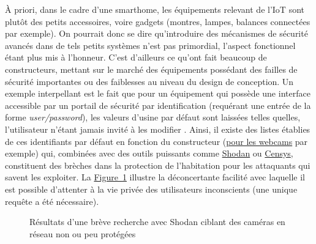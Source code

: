 \documentclass[]{article}
\newcommand{\wordlink}[2]{\hyperref[#1]{#2~\ref{#1}}}
\begin{document}
À priori, dans le cadre d'une smarthome, les équipements relevant de l'IoT sont plutôt des petits accessoires, voire gadgets (montres, lampes, balances connectées par exemple). On pourrait donc se dire qu'introduire des mécanismes de sécurité avancés dans de tels petits systèmes n'est pas primordial, l'aspect fonctionnel étant plus mis à l'honneur. C'est d'ailleurs ce qu'ont fait beaucoup de constructeurs, mettant sur le marché des équipements possédant des failles de sécurité importantes ou des faiblesses au niveau du design de conception. Un exemple interpellant est le fait que pour un équipement qui possède une interface accessible par un portail de sécurité par identification (requérant une entrée  de la forme \textit{user/password}), les valeurs d'usine par défaut sont laissées telles quelles, l'utilisateur n'étant jamais invité à les modifier \cite{Leos2014}. Ainsi, il existe des listes établies de ces identifiants par défaut en fonction du constructeur (\href{https://www.ispyconnect.com/userguide-default-passwords.aspx}{pour les webcams} par exemple) qui, combinées avec des outils puissants comme \href{https://www.shodan.io/}{Shodan} ou \href{https://censys.io/}{Censys}, constituent des brèches dans la protection de l'habitation pour les attaquants qui savent les exploiter. La \wordlink{shodans}{Figure} illustre la déconcertante facilité avec laquelle il est possible d'attenter à la vie privée des utilisateurs inconscients (une unique requête a été nécessaire).\\


    \begin{figure}[!h]
       \noindent{}
       \caption{Résultats d'une brève recherche avec Shodan ciblant des caméras en réseau non ou peu protégées}
       \label{shodans}
    \end{figure}
\end{document}
